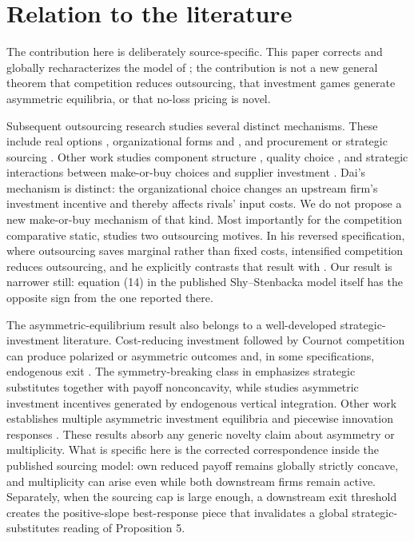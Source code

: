 \section{Relation to the literature}
\label{sec:literature}

The contribution here is deliberately source-specific.  This paper corrects and globally recharacterizes the model of \cite{ShyStenbacka2005}; the contribution is not a new general theorem that competition reduces outsourcing, that investment games generate asymmetric equilibria, or that no-loss pricing is novel.

Subsequent outsourcing research studies several distinct mechanisms.  These include real options \cite{AlvarezStenbacka2007}, organizational forms \cite{ShyStenbacka2012} and \cite{StenbackaTombak2012}, and procurement or strategic sourcing \cite{Rosar2017}.  Other work studies component structure \cite{ChenChen2020}, quality choice \cite{Miyamoto2021}, and strategic interactions between make-or-buy choices and supplier investment \cite{Dai2026}.  Dai's mechanism is distinct: the organizational choice changes an upstream firm's investment incentive and thereby affects rivals' input costs.  We do not propose a new make-or-buy mechanism of that kind.  Most importantly for the competition comparative static, \cite{Konig2010} studies two outsourcing motives.  In his reversed specification, where outsourcing saves marginal rather than fixed costs, intensified competition reduces outsourcing, and he explicitly contrasts that result with \cite{ShyStenbacka2005}.  Our result is narrower still: equation (14) in the published Shy--Stenbacka model itself has the opposite sign from the one reported there.

The asymmetric-equilibrium result also belongs to a well-developed strategic-investment literature.  Cost-reducing investment followed by Cournot competition can produce polarized or asymmetric outcomes and, in some specifications, endogenous exit \cite{Amir2000,AmirHalmenschlagerJin2011}.  The symmetry-breaking class in \cite{AmirGarciaKnauff2010} emphasizes strategic substitutes together with payoff nonconcavity, while \cite{BuehlerSchmutzler2008} studies asymmetric investment incentives generated by endogenous vertical integration.  Other work establishes multiple asymmetric investment equilibria \cite{EckertKlumppSu2017} and piecewise innovation responses \cite{LamantiaPezzinoTramontana2018}.  These results absorb any generic novelty claim about asymmetry or multiplicity.  What is specific here is the corrected correspondence inside the published sourcing model: own reduced payoff remains globally strictly concave, and multiplicity can arise even while both downstream firms remain active.  Separately, when the sourcing cap is large enough, a downstream exit threshold creates the positive-slope best-response piece that invalidates a global strategic-substitutes reading of Proposition 5.

